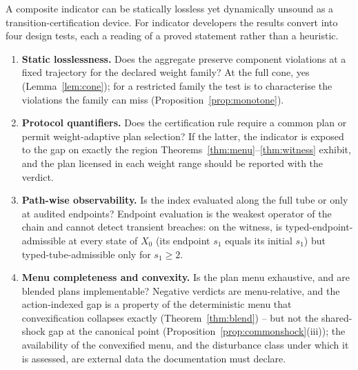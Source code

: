 A composite indicator can be statically lossless yet dynamically unsound as a transition-certification device. For indicator developers the results convert into four design tests, each a reading of a proved statement rather than a heuristic.
\begin{enumerate}[leftmargin=2em]
\item \textbf{Static losslessness.} Does the aggregate preserve component violations at a fixed trajectory for the declared weight family? At the full cone, yes (Lemma~\ref{lem:cone}); for a restricted family the test is to characterise the violations the family can miss (Proposition~\ref{prop:monotone}).
\item \textbf{Protocol quantifiers.} Does the certification rule require a common plan or permit weight-adaptive plan selection? If the latter, the indicator is exposed to the gap on exactly the region Theorems~\ref{thm:menu}--\ref{thm:witness} exhibit, and the plan licensed in each weight range should be reported with the verdict.
\item \textbf{Path-wise observability.} Is the index evaluated along the full tube or only at audited endpoints? Endpoint evaluation is the weakest operator of the chain and cannot detect transient breaches: on the witness,  is typed-endpoint-admissible at every state of $X_0$ (its endpoint $s_1$ equals its initial $s_1$) but typed-tube-admissible only for $s_1\ge2$.
\item \textbf{Menu completeness and convexity.} Is the plan menu exhaustive, and are blended plans implementable? Negative verdicts are menu-relative, and the action-indexed gap is a property of the deterministic menu that convexification collapses exactly (Theorem~\ref{thm:blend}) -- but not the shared-shock gap at the canonical point (Proposition~\ref{prop:commonshock}(iii)); the availability of the convexified menu, and the disturbance class under which it is assessed, are external data the documentation must declare.
\end{enumerate}
